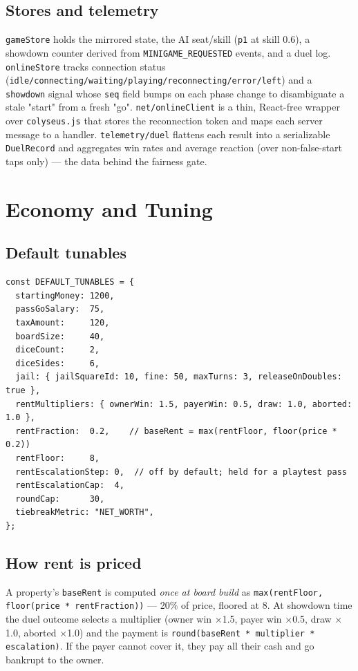 \documentclass[11pt,a4paper]{article}
\newcommand{\code}[1]{\texttt{#1}}
\begin{document}
\subsection{Stores and telemetry}
\code{gameStore} holds the mirrored state, the AI seat/skill (\code{p1} at skill
0.6), a showdown counter derived from \code{MINIGAME\_REQUESTED} events, and a
duel log. \code{onlineStore} tracks connection status
(\code{idle/connecting/waiting/playing/reconnecting/error/left}) and a
\code{showdown} signal whose \code{seq} field bumps on each phase change to
disambiguate a stale "start" from a fresh "go". \code{net/onlineClient} is a
thin, React-free wrapper over \code{colyseus.js} that stores the reconnection
token and maps each server message to a handler. \code{telemetry/duel} flattens
each result into a serializable \code{DuelRecord} and aggregates win rates and
average reaction (over non-false-start taps only) --- the data behind the
fairness gate.

\section{Economy and Tuning}

\subsection{Default tunables}
\begin{lstlisting}
const DEFAULT_TUNABLES = {
  startingMoney: 1200,
  passGoSalary:  75,
  taxAmount:     120,
  boardSize:     40,
  diceCount:     2,
  diceSides:     6,
  jail: { jailSquareId: 10, fine: 50, maxTurns: 3, releaseOnDoubles: true },
  rentMultipliers: { ownerWin: 1.5, payerWin: 0.5, draw: 1.0, aborted: 1.0 },
  rentFraction:  0.2,    // baseRent = max(rentFloor, floor(price * 0.2))
  rentFloor:     8,
  rentEscalationStep: 0,  // off by default; held for a playtest pass
  rentEscalationCap:  4,
  roundCap:      30,
  tiebreakMetric: "NET_WORTH",
};
\end{lstlisting}

\subsection{How rent is priced}
A property's \code{baseRent} is computed \emph{once at board build} as
\code{max(rentFloor, floor(price * rentFraction))} --- 20\% of price, floored at
8. At showdown time the duel outcome selects a multiplier (owner win
$\times$1.5, payer win $\times$0.5, draw $\times$1.0, aborted $\times$1.0) and
the payment is \code{round(baseRent * multiplier * escalation)}. If the payer
cannot cover it, they pay all their cash and go bankrupt to the owner.
\end{document}
